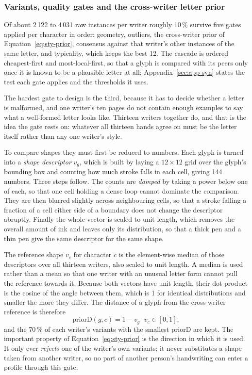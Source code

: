 \subsubsection{Variants, quality gates and the cross-writer letter prior}

Of about 2\,122 to 4\,031 raw instances per writer roughly 10\,\% survive five gates applied per character in order: geometry, outliers, the cross-writer prior of Equation~\ref{eq:sty-prior}, consensus against that writer's other instances of the same letter, and typicality, which keeps the best 12.
The cascade is ordered cheapest-first and most-local-first, so that a glyph is compared with its peers only once it is known to be a plausible letter at all; Appendix~\ref{sec:app-syn} states the test each gate applies and the thresholds it uses.

The hardest gate to design is the third, because it has to decide whether a letter is malformed, and one writer's ten pages do not contain enough examples to say what a well-formed letter looks like. Thirteen writers together do, and that is the idea the gate rests on: whatever all thirteen hands agree on must be the letter itself rather than any one writer's style.

To compare shapes they must first be reduced to numbers. Each glyph is turned into a \emph{shape descriptor} $v_g$, which is built by laying a $12\times12$ grid over the glyph's bounding box and counting how much stroke falls in each cell, giving 144 numbers. Three steps follow. The counts are \emph{damped} by taking a power below one of each, so that one cell holding a dense loop cannot dominate the comparison. They are then blurred slightly across neighbouring cells, so that a stroke falling a fraction of a cell either side of a boundary does not change the descriptor abruptly. Finally the whole vector is scaled to unit length, which removes the overall amount of ink and leaves only its distribution, so that a thick pen and a thin pen give the same descriptor for the same shape.

The reference shape $\bar v_c$ for character $c$ is the element-wise median of those descriptors over all thirteen writers, also scaled to unit length. A median is used rather than a mean so that one writer with an unusual letter form cannot pull the reference towards it. Because both vectors have unit length, their dot product is the cosine of the angle between them, which is 1 for identical distributions and smaller the more they differ. The distance of a glyph from the cross-writer reference is therefore
\begin{equation}
\mathrm{priorD}(g,c)=1-v_g\cdot\bar v_c\in[0,1],
\label{eq:sty-prior}
\end{equation}
and the 70\,\% of each writer's variants with the smallest $\mathrm{priorD}$ are kept. The important property of Equation~\ref{eq:sty-prior} is the direction in which it is used. It only ever \emph{rejects} one of the writer's own variants; it never substitutes a shape taken from another writer, so no part of another person's handwriting can enter a profile through this gate.


